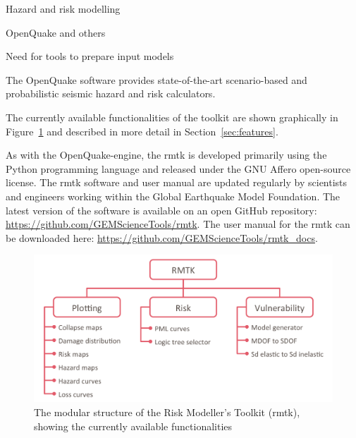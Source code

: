

Hazard and risk modelling

OpenQuake and others

Need for tools to prepare input models



The OpenQuake software provides state-of-the-art scenario-based and probabilistic seismic hazard and risk calculators.

The currently available functionalities of the toolkit are shown graphically in Figure~\ref{fig:rmtk-structure} and described in more detail in Section~\ref{sec:features}.

As with the OpenQuake-engine, the rmtk is developed primarily using the Python programming language and released under the GNU Affero open-source license. The rmtk software and user manual are updated regularly by scientists and engineers working within the Global Earthquake Model Foundation. The latest version of the software is available on an open GitHub repository: \href{https://github.com/GEMScienceTools/rmtk}{https://github.com/GEMScienceTools/rmtk}. The user manual for the rmtk can be downloaded here: \href{https://github.com/GEMScienceTools/rmtk_docs}{https://github.com/GEMScienceTools/rmtk\_docs}.

\begin{figure}[!htbp]
	\centering
	\includegraphics[width=\textwidth]{figures/rmtk_structure.png}
	\caption{The modular structure of the Risk Modeller's Toolkit (rmtk), showing the currently available functionalities}
	\label{fig:rmtk-structure}
\end{figure}





